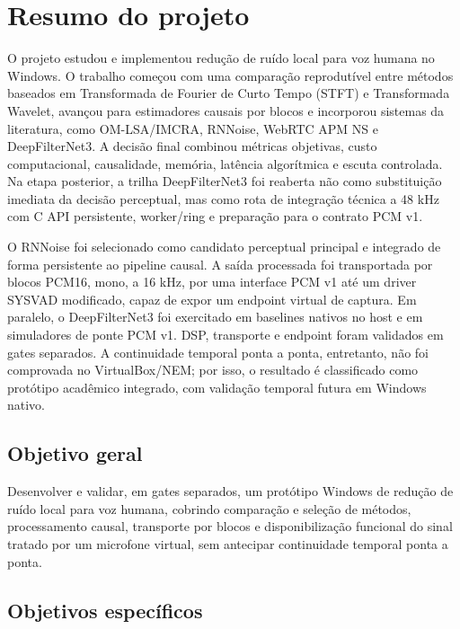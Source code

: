 \section{Resumo do projeto}

O projeto estudou e implementou redução de ruído local para voz humana no Windows. O trabalho começou com uma comparação reprodutível entre métodos baseados em Transformada de Fourier de Curto Tempo (STFT) e Transformada Wavelet, avançou para estimadores causais por blocos e incorporou sistemas da literatura, como OM-LSA/IMCRA, RNNoise, WebRTC APM NS e DeepFilterNet3. A decisão final combinou métricas objetivas, custo computacional, causalidade, memória, latência algorítmica e escuta controlada. Na etapa posterior, a trilha DeepFilterNet3 foi reaberta não como substituição imediata da decisão perceptual, mas como rota de integração técnica a 48 kHz com C API persistente, worker/ring e preparação para o contrato PCM v1.

O RNNoise foi selecionado como candidato perceptual principal e integrado de forma persistente ao pipeline causal. A saída processada foi transportada por blocos PCM16, mono, a 16 kHz, por uma interface PCM v1 até um driver SYSVAD modificado, capaz de expor um endpoint virtual de captura. Em paralelo, o DeepFilterNet3 foi exercitado em baselines nativos no host e em simuladores de ponte PCM v1. DSP, transporte e endpoint foram validados em gates separados. A continuidade temporal ponta a ponta, entretanto, não foi comprovada no VirtualBox/NEM; por isso, o resultado é classificado como protótipo acadêmico integrado, com validação temporal futura em Windows nativo.

\subsection{Objetivo geral}

Desenvolver e validar, em gates separados, um protótipo Windows de redução de ruído local para voz humana, cobrindo comparação e seleção de métodos, processamento causal, transporte por blocos e disponibilização funcional do sinal tratado por um microfone virtual, sem antecipar continuidade temporal ponta a ponta.

\subsection{Objetivos específicos}

